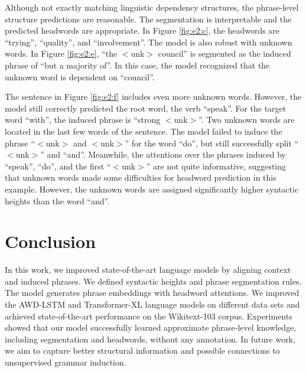 \documentclass[11pt,a4paper]{article}
\begin{document}
Although not exactly matching linguistic dependency structures, the phrase-level structure predictions are reasonable. The segmentation is interpretable and the predicted headwords are appropriate. In Figure \ref{fig:e2:c}, the headwords are ``trying'', ``quality'', and ``involvement''. The model is also robust with unknown words. In Figure \ref{fig:e2:e}, ``the $<$unk$>$ council'' is segmented as the induced phrase of ``but a majority of''. In this case, the model recognized that the unknown word is dependent on ``council''.

The sentence in Figure \ref{fig:e2:f} includes even more unknown words. However, the model still correctly predicted the root word, the verb ``speak''. For the target word ``with'', the induced phrase is ``strong $<$unk$>$''. Two unknown words are located in the last few words of the sentence. The model failed to induce the phrase ``$<$unk$>$ and $<$unk$>$'' for the word ``do'', but still successfully split ``$<$unk$>$'' and ``and''. Meanwhile, the attentions over the phrases induced by ``speak'', ``do'', and the first ``$<$unk$>$'' are not quite informative, suggesting that unknown words made some difficulties for headword prediction in this example. However, the unknown words are assigned significantly higher syntactic heights than the word ``and''.

\section{Conclusion}

In this work, we improved state-of-the-art language models by aligning context and induced phrases. We defined syntactic heights and phrase segmentation rules. The model generates phrase embeddings with headword attentions. We improved the AWD-LSTM and Transformer-XL language models on different data sets and achieved state-of-the-art performance on the Wikitext-103 corpus. Experiments showed that our model successfully learned approximate phrase-level knowledge, including segmentation and headwords, without any annotation. In future work, we aim to capture better structural information and possible connections to unsupervised grammar induction. 





\end{document}
